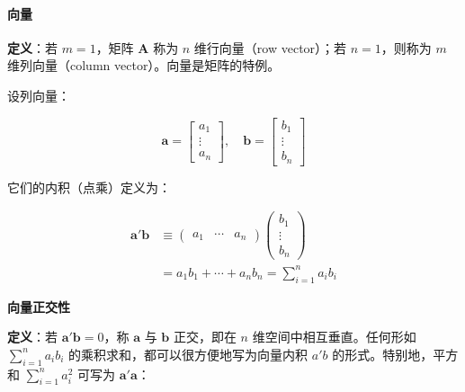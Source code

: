 \paragraph*{向量}

\begin{flushleft}
	\textbf{定义}：若 \( m = 1 \)，矩阵 \( \mathbf{A} \) 称为 \( n \) 维行向量（row vector）；若 \( n = 1 \)，则称为 \( m \) 维列向量（column vector）。向量是矩阵的特例。
\end{flushleft}


\begin{flushleft}
	设列向量：
\end{flushleft}

\begin{equation}
\mathbf{a} = \begin{bmatrix} a_1 \\ \vdots \\ a_n \end{bmatrix},\quad
\mathbf{b} = \begin{bmatrix} b_1 \\ \vdots \\ b_n \end{bmatrix}
\end{equation}

\begin{flushleft}
	它们的内积（点乘）定义为：
\end{flushleft}

\begin{equation}
	\begin{aligned}
		\mathbf{a}'\mathbf{b} &\equiv 
		\begin{pmatrix} a_1 & \cdots & a_n \end{pmatrix}
		\begin{pmatrix} b_1 \\ \vdots \\ b_n \end{pmatrix} \\
		&= a_1 b_1 + \cdots + a_n b_n = \sum_{i=1}^{n} a_i b_i
	\end{aligned}
\end{equation}

\begin{flushleft}
	\textbf{向量正交性}
\end{flushleft}


\begin{flushleft}
	\textbf{定义}：若 \( \mathbf{a}'\mathbf{b} = 0 \)，称 \( \mathbf{a} \) 与 \( \mathbf{b} \) 正交，即在 \( n \) 维空间中相互垂直。任何形如 $\sum_{i=1}^{n} a_i b_i$ 的乘积求和，都可以很方便地写为向量内积 $a'b$ 的形式。特别地，平方和 $\sum_{i=1}^{n} a_i^2$ 可写为 $\mathbf{a'a}$：
\end{flushleft}


